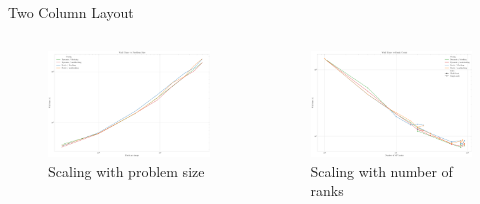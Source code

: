 \begin{frame}{Two Column Layout}
    \begin{columns}
        \begin{figure}
          \begin{center}
            \includegraphics[width=1.15\textwidth]{figures/Plots/4_scaling_problem/4.1_wall_time_vs_pixels.pdf}
            \caption*{Scaling with problem size}\label{fig:wall_time_vs_pixels}
          \end{center}
        \end{figure}
        

        \begin{figure}
          \begin{center}
            \includegraphics[width=1.15\textwidth]{figures/Plots/5_scaling_ranks/5.1_wall_time_vs_ranks.pdf}
            \caption*{Scaling with number of ranks}\label{fig:wall_time_vs_ranks}
          \end{center}
        \end{figure}
          
    \end{columns}
\end{frame}

